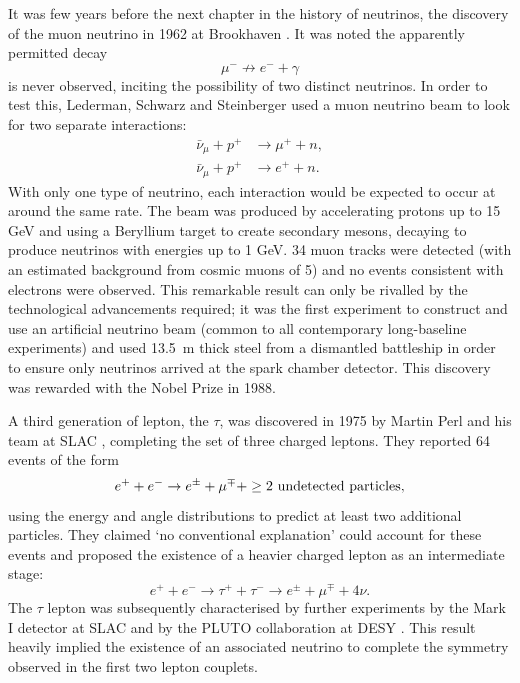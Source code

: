 It was few years before the next chapter in the history of neutrinos, the discovery of the muon neutrino in 1962 at Brookhaven \cite{Danby1962}.  It was noted the apparently permitted decay
\begin{equation}
\mu^- \not\rightarrow e^- + \gamma
\end{equation}
is never observed, inciting the possibility of two distinct neutrinos.  In order to test this, Lederman, Schwarz and Steinberger used a muon neutrino beam to look for two separate interactions:
\begin{align}
  \bar{\nu}_{\mu} + p^+ &\rightarrow \mu^+ + n, \\
  \bar{\nu}_{\mu} + p^+ &\rightarrow e^+ + n.
\end{align}
With only one type of neutrino, each interaction would be expected to occur at around the same rate.  The beam was produced by accelerating protons up to 15 GeV and using a Beryllium target to create secondary mesons, decaying to produce neutrinos with energies up to 1 GeV.  34 muon tracks were detected (with an estimated background from cosmic muons of 5) and no events consistent with electrons were observed.  This remarkable result can only be rivalled by the technological advancements required; it was the first experiment to construct and use an artificial neutrino beam (common to all contemporary long-baseline experiments) and used 13.5~m thick steel from a dismantled battleship in order to ensure only neutrinos arrived at the spark chamber detector.  This discovery was rewarded with the Nobel Prize in 1988.

A third generation of lepton, the $\tau$, was discovered in 1975 by Martin Perl and his team at SLAC \cite{Perl1975}, completing the set of three charged leptons.  They reported 64 events of the form
\begin{equation}
  e^+ + e^- \rightarrow e^{\pm} + \mu^{\mp} + \ge 2 \textnormal{ undetected particles},
\end{equation}
using the energy and angle distributions to predict at least two additional particles.  They claimed `no conventional explanation' could account for these events and proposed the existence of a heavier charged lepton as an intermediate stage:
\begin{equation}
  e^+ + e^- \rightarrow \tau^+ + \tau^- \rightarrow e^{\pm} + \mu^{\mp} + 4\nu.
\end{equation}
The $\tau$ lepton was subsequently characterised by further experiments by the Mark I detector at SLAC \cite{Feldman1977} and by the PLUTO collaboration at DESY \cite{Burmester1977}.  This result heavily implied the existence of an associated neutrino to complete the symmetry observed in the first two lepton couplets.

